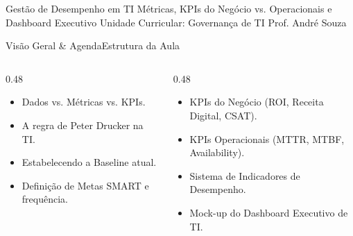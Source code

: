 
\senaicover
  {Gestão de Desempenho em TI}
  {Métricas, KPIs do Negócio vs. Operacionais e Dashboard Executivo}
  {Unidade Curricular: Governança de TI}
  {Prof. André Souza}

\begin{senaiframe}{Visão Geral \& Agenda}{Estrutura da Aula}
  \begin{columns}[t]
    \begin{column}{0.48\textwidth}
      \begin{tcolorbox}[senaibluecard, title={1. Hierarquia da Medição}]
        \begin{itemize}
          \item Dados vs. Métricas vs. KPIs.
          \item A regra de Peter Drucker na TI.
        \end{itemize}
      \end{tcolorbox}
      \vspace{4pt}
      \begin{tcolorbox}[senaiambercard, title={3. Linha de Base \& Metas}]
        \begin{itemize}
          \item Estabelecendo a Baseline atual.
          \item Definição de Metas SMART e frequência.
        \end{itemize}
      \end{tcolorbox}
    \end{column}
    \begin{column}{0.48\textwidth}
      \begin{tcolorbox}[senairedcard, title={2. Categorias de KPIs}]
        \begin{itemize}
          \item KPIs do Negócio (ROI, Receita Digital, CSAT).
          \item KPIs Operacionais (MTTR, MTBF, Availability).
        \end{itemize}
      \end{tcolorbox}
      \vspace{4pt}
      \begin{tcolorbox}[senaigreencard, title={4. Capítulo 5 do PDGTI}]
        \begin{itemize}
          \item Sistema de Indicadores de Desempenho.
          \item Mock-up do Dashboard Executivo de TI.
        \end{itemize}
      \end{tcolorbox}
    \end{column}
  \end{columns}
\end{senaiframe}

